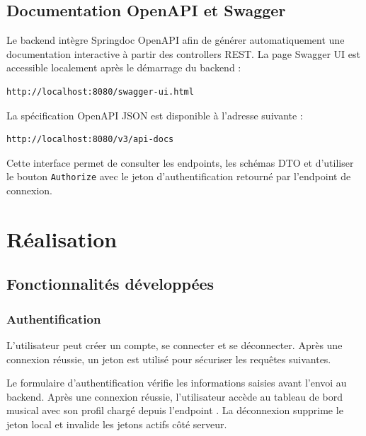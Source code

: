 \documentclass[12pt,a4paper]{report}
\newcommand{\code}[1]{\texttt{#1}}
\begin{document}
\section{Documentation OpenAPI et Swagger}

Le backend intègre Springdoc OpenAPI afin de générer automatiquement une
documentation interactive à partir des controllers REST. La page Swagger UI est
accessible localement après le démarrage du backend :

\begin{lstlisting}
http://localhost:8080/swagger-ui.html
\end{lstlisting}

La spécification OpenAPI JSON est disponible à l'adresse suivante :

\begin{lstlisting}
http://localhost:8080/v3/api-docs
\end{lstlisting}

Cette interface permet de consulter les endpoints, les schémas DTO et
d'utiliser le bouton \code{Authorize} avec le jeton d'authentification retourné
par l'endpoint de connexion.


\chapter{Réalisation}

\section{Fonctionnalités développées}

\subsection{Authentification}

L'utilisateur peut créer un compte, se connecter et se déconnecter. Après une
connexion réussie, un jeton est utilisé pour sécuriser les requêtes suivantes.

Le formulaire d'authentification vérifie les informations saisies avant
l'envoi au backend. Après une connexion réussie, l'utilisateur accède au tableau
de bord musical avec son profil chargé depuis l'endpoint .
La déconnexion supprime le jeton local et invalide les jetons actifs côté
serveur.
\end{document}
